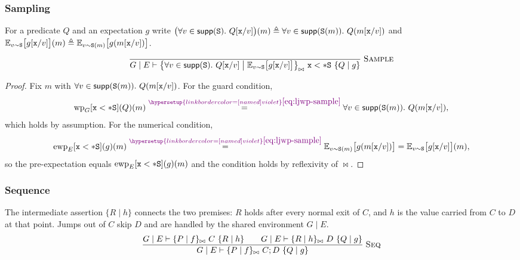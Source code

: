 \documentclass[acmsmall,natbib,review,screen,anonymous,10pt]{acmart}
\makeatletter
\let\@msm@th@eqref\eqref
\renewcommand{\eqref}[1]{%
  \begingroup
  \leavevmode
  \color{violet}%
  \hypersetup{linkbordercolor=[named]{violet}}%
  \@msm@th@eqref{#1}%
  \endgroup
}
\makeatother
\begin{document}
\subsubsection{Sampling}\label{app:lj-rule-sample}
For a predicate $Q$ and an expectation $g$ write
$\bigl(\forall v\in\mathsf{supp}(\mathtt{S}).\ Q[\mathtt{x}\slash v]\bigr)(m)\triangleq
\forall v\in\mathsf{supp}(\mathtt{S}(m)).\ Q(m[\mathtt{x}\slash v])$ and
$\mathbb E_{v\sim\mathtt{S}}\bigl[g[\mathtt{x}\slash v]\bigr](m)\triangleq
\mathbb E_{v\sim\mathtt{S}(m)}\bigl[g(m[\mathtt{x}\slash v])\bigr]$.
\[
  \frac{}{
    G\mid E\vdash
    \bigl\{\forall v\in\mathsf{supp}(\mathtt{S}).\ Q[\mathtt{x}\slash v]\bigm|
    \mathbb E_{v\sim\mathtt{S}}\bigl[g[\mathtt{x}\slash v]\bigr]\bigr\}_{\bowtie}\
    \mathtt{x} <* \mathtt{S}\
    \{Q\mid g\}
  }
  \;\textsc{Sample}
\]

\begin{proof}
Fix $m$ with $\forall v\in\mathsf{supp}(\mathtt{S}(m)).\ Q(m[\mathtt{x}\slash v])$.
For the guard condition,
\[
  \mathrm{wp}_{G}[\vx <* \sexpr](Q)(m)
  \overset{\eqref{eq:ljwp-sample}}{=}
  \forall v\in\supp(\sexpr(m)).\ Q(m[\vx\mapped v]),
\]
which holds by assumption.
For the numerical condition,
\[
  \mathrm{ewp}_{E}[\vx <* \sexpr](g)(m)
  \overset{\eqref{eq:ljwp-sample}}{=}
  \mathbb E_{v\sim\sexpr(m)}\bigl[g(m[\vx\mapped v])\bigr]
  =
  \mathbb E_{v\sim\sexpr}\bigl[g[\vx\mapped v]\bigr](m),
\]
so the pre-expectation equals $\mathrm{ewp}_{E}[\mathtt{x} <* \mathtt{S}](g)(m)$
and the condition holds by reflexivity of $\bowtie$.
\end{proof}

\subsubsection{Sequence}\label{app:lj-rule-seq}
The intermediate assertion $\{R\mid h\}$ connects the two premises: $R$
holds after every normal exit of $C$, and $h$ is the value carried from
$C$ to $D$ at that point. Jumps out of $C$ skip $D$ and are handled by the
shared environment $G\mid E$.
\[
  \frac{
    G\mid E\vdash\{P\mid f\}_{\bowtie}\ C\ \{R\mid h\}
    \qquad
    G\mid E\vdash\{R\mid h\}_{\bowtie}\ D\ \{Q\mid g\}
  }{
    G\mid E\vdash\{P\mid f\}_{\bowtie}\ C;D\ \{Q\mid g\}
  }
  \;\textsc{Seq}
\]
\end{document}
